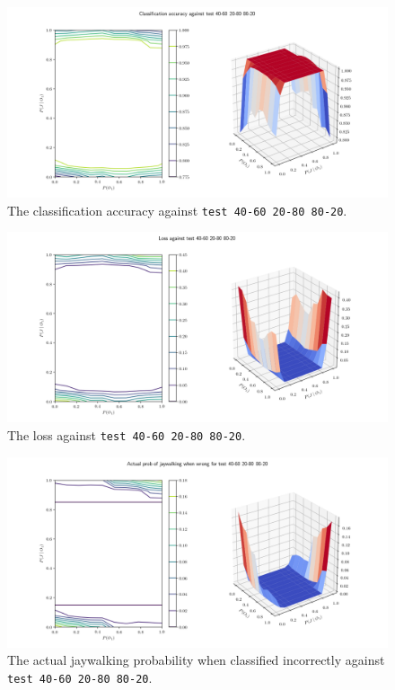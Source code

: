 \documentclass[]{report}
\newcommand{\code}{\texttt}
\begin{document}
% 
% 

\begin{figure}[h]
    \centering
    \centerline{\includegraphics[scale=0.55]{test_40-60_20-80_80-20_accuracy.png}}
    \caption[]{The classification accuracy against \code{test 40-60 20-80 80-20}.}
    \label{fig:test_40-60_20-80_80-20_accuracy_plot}
\end{figure}

\begin{figure}[h]
    \centering
    \centerline{\includegraphics[scale=0.55]{test_40-60_20-80_80-20_loss.png}}
    \caption[]{The loss against \code{test 40-60 20-80 80-20}.}
    \label{fig:test_40-60_20-80_80-20_loss_plot}
\end{figure}

\begin{figure}[h]
    \centering
    \centerline{\includegraphics[scale=0.55]{test_40-60_20-80_80-20_jay_prob.png}}
    \caption[]{The actual jaywalking probability when classified incorrectly against \code{test 40-60 20-80 80-20}.}
    \label{fig:test_40-60_20-80_80-20_jay_prob_plot}
\end{figure}
\end{document}
